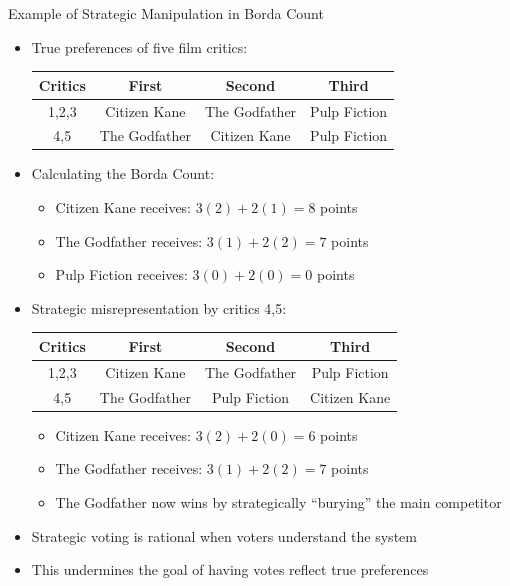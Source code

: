 \documentclass[10pt,handout]{beamer}
\begin{document}
\begin{frame}{Example of Strategic Manipulation in Borda Count}
  \begin{itemize}
    \item True preferences of five film critics:
      \begin{table}
        \center
        \begin{tabular}{cccc}
          \toprule
          \textbf{Critics} & \textbf{First} & \textbf{Second} & \textbf{Third} \\
          \midrule
          1,2,3 & Citizen Kane & The Godfather & Pulp Fiction \\
          4,5 & The Godfather & Citizen Kane & Pulp Fiction \\
          \bottomrule
        \end{tabular}
      \end{table}
    \item Calculating the Borda Count:
      \begin{itemize}
        \item Citizen Kane receives: $3(2) + 2(1) = 8$ points
        \item The Godfather receives: $3(1) + 2(2) = 7$ points
        \item Pulp Fiction receives: $3(0) + 2(0) = 0$ points
      \end{itemize}
    \item Strategic misrepresentation by critics 4,5:
      \begin{table}
        \center
        \begin{tabular}{cccc}
          \toprule
          \textbf{Critics} & \textbf{First} & \textbf{Second} & \textbf{Third} \\
          \midrule
          1,2,3 & Citizen Kane & The Godfather & Pulp Fiction \\
          4,5 & The Godfather & Pulp Fiction & Citizen Kane \\
          \bottomrule
        \end{tabular}
      \end{table}
      \begin{itemize}
        \item Citizen Kane receives: $3(2) + 2(0) = 6$ points
        \item The Godfather receives: $3(1) + 2(2) = 7$ points
        \item The Godfather now wins by strategically ``burying'' the main competitor
      \end{itemize}
    \item Strategic voting is rational when voters understand the system
    \item This undermines the goal of having votes reflect true preferences
  \end{itemize}
\end{frame}
\end{document}
